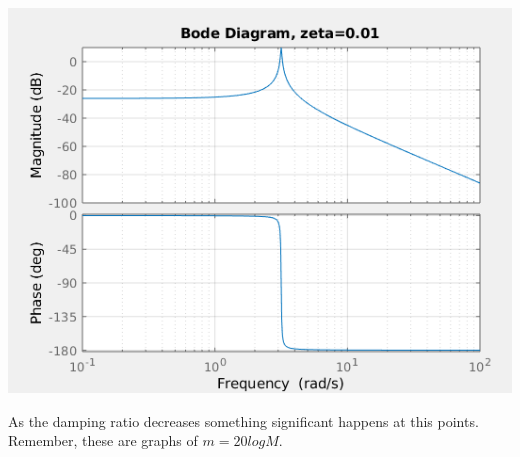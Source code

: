 \documentclass[fleqn]{beamer} %
\begin{document}
\begin{frame}
				\includegraphics[scale=.18]{images/lecture4_fig3.png}  \vspc

				As the damping ratio decreases something significant happens at this points. Remember, these are graphs of $m=20logM$. \vspc
	
				\btVFill
			\end{frame}
\end{document}
